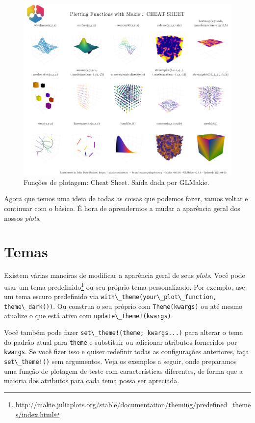 \documentclass[
  notoc %
]{tufte-book}
\DeclareRobustCommand{\href}[2]{#2\footnote{\url{#1}}}
\newcommand{\passthrough}[1]{#1}
\begin{document}
\begin{figure}
\hypertarget{fig:cheat_sheet_glmakie}{%
\centering
\includegraphics{images/GLMakiePlottingFunctionsHide.png}
\caption{Funções de plotagem: Cheat Sheet. Saída dada por
GLMakie.}\label{fig:cheat_sheet_glmakie}
}
\end{figure}

Agora que temos uma ideia de todas as coisas que podemos fazer, vamos
voltar e continuar com o básico. É hora de aprendermos a mudar a
aparência geral dos nossos \emph{plots}.

\hypertarget{sec:themes}{%
\section{Temas}\label{sec:themes}}

Existem várias maneiras de modificar a aparência geral de seus
\emph{plots}. Você pode usar um
\href{http://makie.juliaplots.org/stable/documentation/theming/predefined_themes/index.html}{tema
predefinido} ou seu próprio tema personalizado. Por exemplo, use um tema
escuro predefinido via
\passthrough{\lstinline!with\_theme(your\_plot\_function, theme\_dark())!}.
Ou construa o seu próprio com \passthrough{\lstinline!Theme(kwargs)!} ou
até mesmo atualize o que está ativo com
\passthrough{\lstinline"update\_theme!(kwargs)"}.

Você também pode fazer
\passthrough{\lstinline"set\_theme!(theme; kwargs...)"} para alterar o
tema do padrão atual para \passthrough{\lstinline!theme!} e substituir
ou adicionar atributos fornecidos por \passthrough{\lstinline!kwargs!}.
Se você fizer isso e quiser redefinir todas as configurações anteriores,
faça \passthrough{\lstinline"set\_theme!()"} sem argumentos. Veja os
exemplos a seguir, onde preparamos uma função de plotagem de teste com
características diferentes, de forma que a maioria dos atributos para
cada tema possa ser apreciada.
\end{document}
